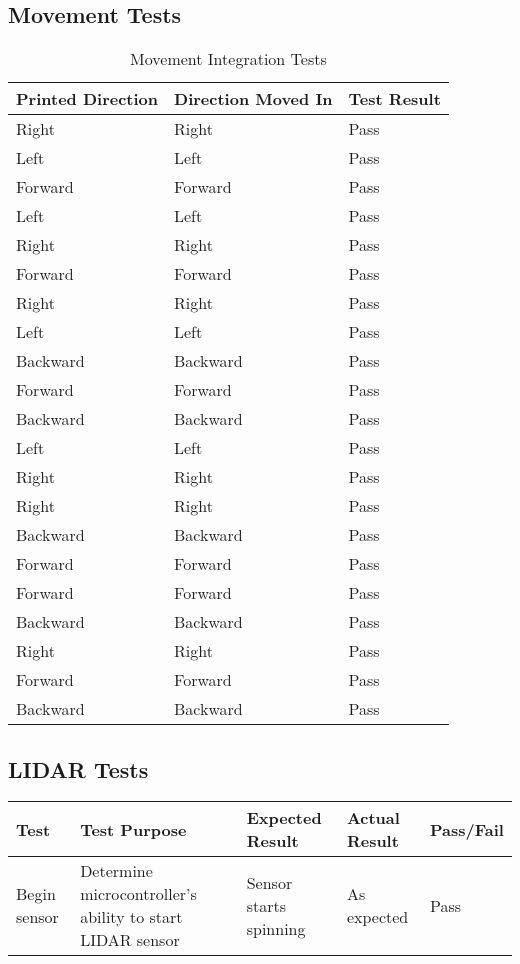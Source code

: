 \begin{landscape}
					\subsection{Movement Tests}
					\begin{table}[h!]
						\centering
						\begin{tabular}{| l | l | l |} 
							\hline
							Printed Direction & Direction Moved In & Test Result  \\ [0.5ex] 
							\hline
							Right & Right & Pass   \\
							Left & Left & Pass   \\ 
							Forward & Forward & Pass   \\ 
							Left & Left & Pass   \\ 
							Right & Right & Pass   \\ 
							Forward & Forward & Pass   \\ 
							Right & Right & Pass   \\ 
							Left & Left & Pass   \\ 
							Backward & Backward & Pass   \\ 
							Forward & Forward & Pass   \\ 
							Backward & Backward & Pass   \\ 
							Left & Left & Pass   \\ 
							Right & Right & Pass   \\ 
							Right & Right & Pass  \\ 
							Backward & Backward & Pass   \\ 
							Forward & Forward & Pass   \\ 
							Forward & Forward & Pass  \\ 
							Backward & Backward & Pass  \\ 
							Right & Right & Pass   \\ 
							Forward & Forward & Pass   \\ 
							Backward & Backward & Pass   \\ [1ex] 
							\hline
						\end{tabular}	
					\caption{Movement Integration Tests}
					\label{table:movementtestsbasic}	
					\end{table}
				
					\subsection{LIDAR Tests}
					\begin{table}[h!]
						\centering
						\begin{tabular}{| p{2.5cm} | p{5cm} | p{4cm} | p{3cm} | p{1.5cm} |} 
							\hline
							Test & Test Purpose & Expected Result & Actual Result & Pass/Fail \\ [0.5ex] 
							\hline
							Begin sensor & Determine microcontroller's ability to start LIDAR sensor & Sensor starts spinning & As expected & Pass  \\
							

\end{tabular}
\end{table}
\end{landscape}
